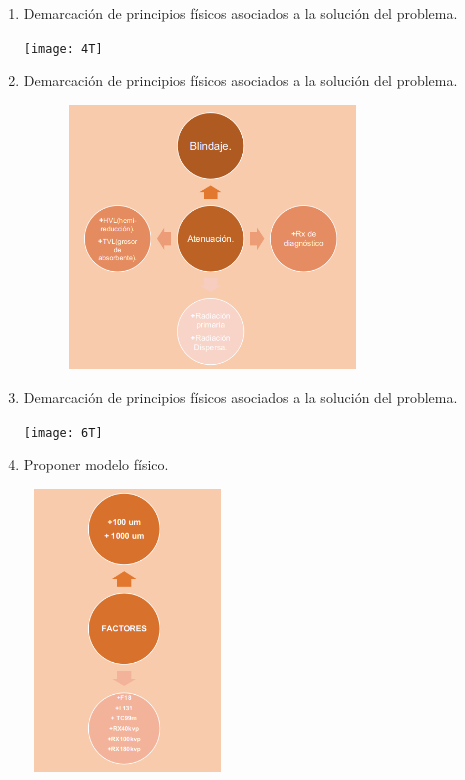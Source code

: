 \documentclass{beamer}
\begin{document}
\begin{enumerate}
\newpage
\item Demarcación de  principios físicos asociados a la solución del problema.
\begin{center}
\texttt{[image: 4T]}
\end{center}
\newpage
\item Demarcación de  principios físicos asociados a la solución del problema. 
\begin{center}
\includegraphics[width=10cm,height=7cm]{5T}
\end{center}
\newpage

\item Demarcación de  principios físicos asociados a la solución del problema. 
\begin{center}
\texttt{[image: 6T]}
\end{center}


\newpage
 \item Proponer modelo físico.
\begin{center}
\includegraphics[width=5.5cm,height=7.5cm]{7T}
\end{center}
 

\end{enumerate}
\end{document}
